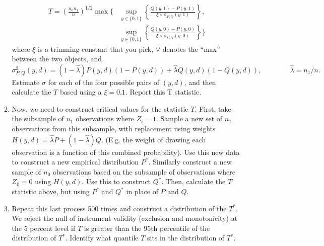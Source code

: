 \documentclass[11pt, a4paper]{article}
\begin{document}
\begin{enumerate}
\begin{enumerate}
    \begin{align*}
      T = \left(\frac{n_{0}n_{1}}{n}\right)^{1/2} \max \bigl\{&\sup_{y\in \{0,1\}} \left\{\frac{Q(y,1) - P(y,1)}{\xi \vee \sigma_{P,Q}(y,1)}\right\},\\
      &\sup_{y\in \{0,1\}} \left\{\frac{Q(y,0) - P(y,0)}{\xi \vee \sigma_{P,Q}(y,0)}\right\}\bigr\}
    \end{align*}
    where $\xi$ is a trimming constant that you pick, $\vee$ denotes the ``max'' between the two objects, and
    \begin{equation*}
      \sigma^{2}_{P,Q}(y,d) = (1-\hat{\lambda})P(y,d)(1-P(y,d)) + \hat{\lambda}Q(y,d)(1-Q(y,d)), \qquad \qquad \hat{\lambda} = n_{1}/n.
    \end{equation*}
    Estimate $\sigma$ for each of the four possible pairs of $(y,d)$,
    and then calculate the $T$ based using a $\xi = 0.1$. Report this T statistic.
  \item Now, we need to construct critical values for the statistic
    $T$. First, take the subsample of $n_{1}$ observations where
    $Z_{i}=1$. Sample a new set of $n_{1}$ observations from this
    subsample, with replacement using weights
    $H(y,d) = \hat{\lambda}P + (1-\hat{\lambda})Q$. (E.g. the weight
    of drawing each observation is a function of this combined
    probability). Use this new data to construct a new empirical
    distribution $P^{*}$. Similarly construct a new sample of $n_{0}$
    observations based on the subsample of observations where
    $Z_{0} = 0$ using $H(y,d)$. Use this to construct $Q^{*}$. Then,
    calculate the $T$ statistic above, but using $P^{*}$ and $Q^{*}$
    in place of $P$ and $Q$.
  \item Repeat this last process 500 times and construct a
    distribution of the $T^{*}$. We reject the null of instrument
    validity (exclusion and monotonicity) at the 5 percent level if
    $T$ is greater than the 95th percentile of the distribution of
    $T^{*}$. Identify what quantile $T$ sits in the distribution of
    $T^{*}$.
  \end{enumerate}
\end{enumerate}
  
\end{document}
